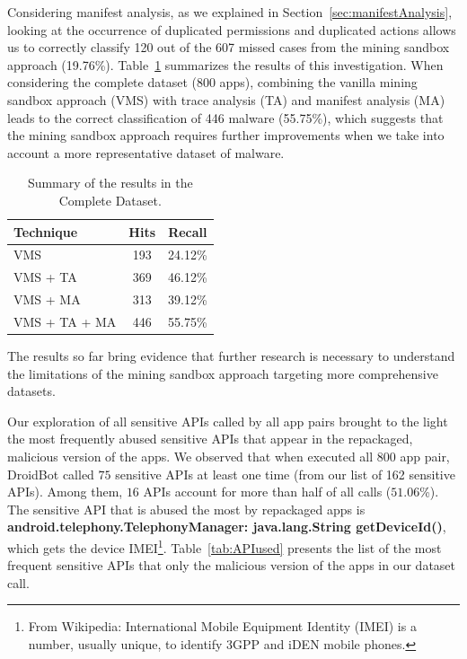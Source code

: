 Considering
manifest analysis, as we explained in Section~\ref{sec:manifestAnalysis},
looking at the occurrence of duplicated permissions and duplicated 
actions allows us to correctly classify \num{120} out of the \num{607} missed cases
from the mining sandbox approach (\num{19.76}\%).                                   
Table~\ref{tab:mfa-complete} summarizes the results of this investigation. When considering the 
complete dataset (\num{800} apps), combining the vanilla
mining sandbox approach (VMS) with trace analysis (TA) and
manifest analysis (MA) leads to the correct classification
of \num{446} malware (\num{55.75}\%), which suggests that
the mining sandbox approach requires further improvements when
we take into account a more representative dataset
of malware. 


\begin{table}[ht]
  \caption{Summary of the results in the Complete Dataset.}
  \centering
  \begin{small}
  \begin{tabular}{lcc}\toprule
  Technique      & Hits & Recall \\ \midrule 
  VMS            & 193  & \num{24.12}\% \\ 
  VMS + TA       & 369  & \num{46.12}\%  \\
  VMS + MA       & 313  & \num{39.12}\% \\
  VMS + TA + MA  & 446  & \num{55.75}\% \\  \bottomrule
  \end{tabular}
  \end{small}
 \label{tab:mfa-complete}
\end{table}

\begin{obs}{5}{}
  The results so far bring evidence that
  further research is necessary to understand
  the limitations of the mining sandbox approach
  targeting more comprehensive datasets.
\end{obs}

Our exploration of all sensitive APIs called by all app pairs brought to the light the most frequently abused sensitive APIs that
appear in the repackaged, malicious version of the apps. We observed that when executed all 800 app pair, DroidBot called $75$ sensitive APIs at least one time (from our list of 162 sensitive APIs). Among them, $16$ APIs account for more than half of all calls ($51.06$\%).
The sensitive API that is abused the most by repackaged apps is \textbf{android.telephony.TelephonyManager: java.lang.String getDeviceId()}, which gets the device
IMEI\footnote{From Wikipedia: International Mobile Equipment Identity (IMEI) is a number, usually unique, to identify 3GPP and iDEN mobile phones.}.
Table~\ref{tab:APIused} presents the list of the most frequent sensitive APIs that only the malicious
version of the apps in our dataset call.

